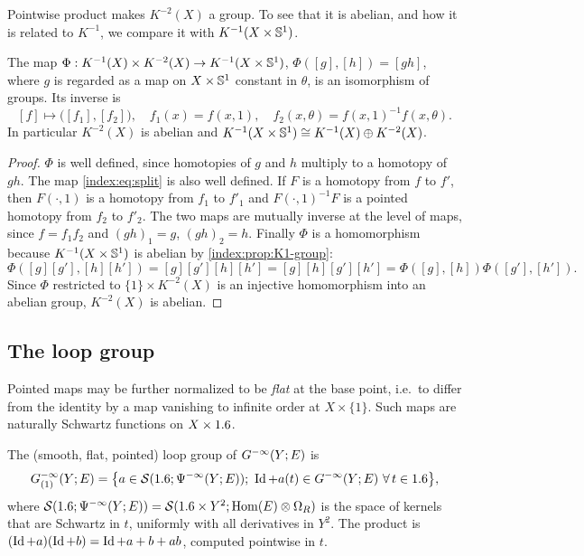 Pointwise product makes $K^{-2}(X)$ a group. To see that it is abelian, and
how it is related to $K^{-1}$, we compare it with $K^{-1}(X\times\mathbb{S}^1)$.

\begin{lemma}\label{index:lem:K1-split}
  The map $\Phi:K^{-1}(X)\times K^{-2}(X)\to K^{-1}(X\times\mathbb{S}^1)$,
  $\Phi([g],[h])=[gh]$, where $g$ is regarded as a map on $X\times\mathbb{S}^1$
  constant in $\theta$, is an isomorphism of groups. Its inverse is
  \begin{equation}\label{index:eq:split}
    [f]\mapsto\bigl([f_1],[f_2]\bigr),\quad f_1(x)=f(x,1),\quad
    f_2(x,\theta)=f(x,1)^{-1}f(x,\theta).
  \end{equation}
  In particular $K^{-2}(X)$ is abelian and
  $K^{-1}(X\times\mathbb{S}^1)\cong K^{-1}(X)\oplus K^{-2}(X)$.
\end{lemma}
\begin{proof}
  $\Phi$ is well defined, since homotopies of $g$ and $h$ multiply to a
  homotopy of $gh$. The map \eqref{index:eq:split} is also well defined. If
  $F$ is a homotopy from $f$ to $f'$, then $F(\cdot,1)$ is a homotopy from
  $f_1$ to $f'_1$ and $F(\cdot,1)^{-1}F$ is a pointed homotopy from $f_2$ to
  $f'_2$. The two maps are mutually inverse at the level of maps, since
  $f=f_1f_2$ and $(gh)_1=g$, $(gh)_2=h$. Finally $\Phi$ is a homomorphism
  because $K^{-1}(X\times\mathbb{S}^1)$ is abelian by
  \cref{index:prop:K1-group}:
  \begin{equation*}
    \Phi([g][g'],[h][h'])=[g][g'][h][h']=[g][h][g'][h']
    =\Phi([g],[h])\Phi([g'],[h']).
  \end{equation*}
  Since $\Phi$ restricted to $\{1\}\times K^{-2}(X)$ is an injective
  homomorphism into an abelian group, $K^{-2}(X)$ is abelian.
\end{proof}

\subsection{The loop group}
Pointed maps may be further normalized to be \emph{flat} at the base point,
i.e.\ to differ from the identity by a map vanishing to infinite order at
$X\times\{1\}$. Such maps are naturally Schwartz functions on $X\times1.6$.

\begin{definition}\label{index:def:loop-group}
  The (smooth, flat, pointed) loop group of $G^{-\infty}(Y;E)$ is
  \begin{equation*}
    \Gloop(Y;E)=\bigl\{a\in\cS(\R;\Psido{-\infty}(Y;E));\ \Id+a(t)\in
    \Ginf(Y;E)\ \forall\,t\in\R\bigr\},
  \end{equation*}
  where
  $\mathcal{S}(1.6;\Psi^{-\infty}(Y;E))=\mathcal{S}(1.6\times Y^2;\operatorname{Hom}(E)\otimes\Omega_R)$ is
  the space of kernels that are Schwartz in $t$, uniformly with all
  derivatives in $Y^2$. The product is $(\operatorname{Id}+a)(\operatorname{Id}+b)=\operatorname{Id}+a+b+ab$, computed
  pointwise in $t$.
\end{definition}

